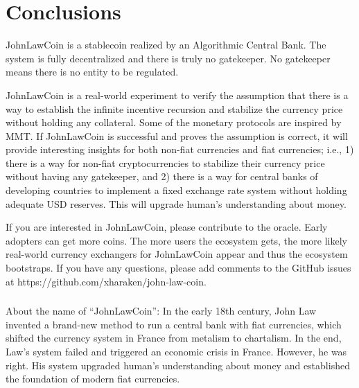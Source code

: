 \documentclass[dvipdfmx,a4paper]{article}
\begin{document}
\section{Conclusions}

JohnLawCoin is a stablecoin realized by an Algorithmic Central Bank. The system is fully decentralized and there is truly no gatekeeper. No gatekeeper means there is no entity to be regulated.

JohnLawCoin is a real-world experiment to verify the assumption that there is a way to establish the infinite incentive recursion and stabilize the currency price without holding any collateral. Some of the monetary protocols are inspired by MMT. If JohnLawCoin is successful and proves the assumption is correct, it will provide interesting insights for both non-fiat currencies and fiat currencies; i.e., 1) there is a way for non-fiat cryptocurrencies to stabilize their currency price without having any gatekeeper, and 2) there is a way for central banks of developing countries to implement a fixed exchange rate system without holding adequate USD reserves. This will upgrade human's understanding about money.

If you are interested in JohnLawCoin, please contribute to the oracle. Early adopters can get more coins. The more users the ecosystem gets, the more likely real-world currency exchangers for JohnLawCoin appear and thus the ecosystem bootstraps. If you have any questions, please add comments to the GitHub issues at https://github.com/xharaken/john-law-coin.

\subsubsection*{}

About the name of ``JohnLawCoin'': In the early 18th century, John Law~\cite{davies2010history,ferguson2008ascent,iwai1997evolution} invented a brand-new method to run a central bank with fiat currencies, which shifted the currency system in France from metalism to chartalism. In the end, Law's system failed and triggered an economic crisis in France. However, he was right. His system upgraded human's understanding about money and established the foundation of modern fiat currencies.



\end{document}

